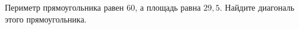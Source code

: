 \begin{ex}
	\begin{condition}
		Периметр прямоугольника равен \( 60 \), а площадь равна \( 29,5 \). Найдите диагональ этого прямоугольника.
	\end{condition}
\end{ex}